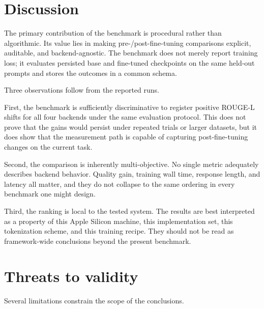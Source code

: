 \documentclass[11pt]{article}
\begin{document}
\section{Discussion}

The primary contribution of the benchmark is procedural rather than algorithmic. Its value lies in making pre-/post-fine-tuning comparisons explicit, auditable, and backend-agnostic. The benchmark does not merely report training loss; it evaluates persisted base and fine-tuned checkpoints on the same held-out prompts and stores the outcomes in a common schema.

Three observations follow from the reported runs.

First, the benchmark is sufficiently discriminative to register positive ROUGE-L shifts for all four backends under the same evaluation protocol. This does not prove that the gains would persist under repeated trials or larger datasets, but it does show that the measurement path is capable of capturing post-fine-tuning changes on the current task.

Second, the comparison is inherently multi-objective. No single metric adequately describes backend behavior. Quality gain, training wall time, response length, and latency all matter, and they do not collapse to the same ordering in every benchmark one might design.

Third, the ranking is local to the tested system. The results are best interpreted as a property of this Apple Silicon machine, this implementation set, this tokenization scheme, and this training recipe. They should not be read as framework-wide conclusions beyond the present benchmark.

\section{Threats to validity}

Several limitations constrain the scope of the conclusions.
\end{document}
